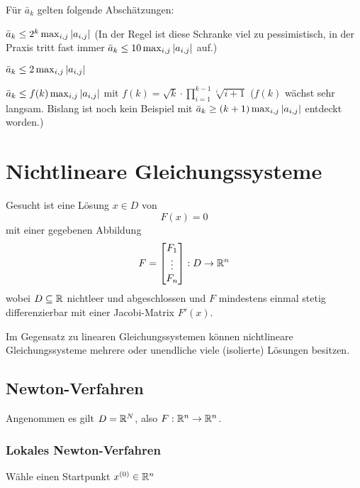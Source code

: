             Für \( \bar{a}_k \) gelten folgende Abschätzungen:
            \begin{description}[leftmargin = 5cm]
            	\item[Spaltenpivotsuche] \( \bar{a}_k \leq 2^k \max_{i,j} \abs{a_{i,j}} \) (In der Regel ist diese Schranke viel zu pessimistisch, in der Praxis tritt fast immer \( \bar{a}_k \leq 10 \max_{i,j} \abs{a_{i,j}} \) auf.)
            	\item[Spaltenpivotsuche (bei Tridiagonalmatrizen)] \( \bar{a}_k \leq 2 \max_{i,j} \abs{a_{i,j}} \)
            	\item[Vollständige Pivotsuche] \( \bar{a}_k \leq f(k) \max_{i,j} \abs{a_{i,j}} \) mit \( f(k) = \sqrt{k} \cdot \prod_{i = 1}^{k - 1} \sqrt[i]{i + 1} \) (\(f(k)\) wächst sehr langsam. Bislang ist noch kein Beispiel mit \( \bar{a}_k \geq (k + 1) \max_{i,j} \abs{a_{i,j}} \) entdeckt worden.)
            \end{description}

\chapter{Nichtlineare Gleichungssysteme}
    Gesucht ist eine Lösung \( x \in D \) von \[ F(x) = 0 \] mit einer gegebenen Abbildung
    \begin{equation*}
	    F =
	    \begin{bmatrix}
		    F_1 \\
		    \vdots \\
		    F_n
	    \end{bmatrix}
	    : D \rightarrow \mathbb{R}^n
    \end{equation*}
    wobei \( D \subseteq \mathbb{R} \) nichtleer und abgeschlossen und \(F\) mindestens einmal stetig differenzierbar mit einer Jacobi-Matrix \(F'(x)\).
    
    Im Gegensatz zu linearen Gleichungssystemen können nichtlineare Gleichungssysteme mehrere oder unendliche viele (isolierte) Lösungen besitzen.

    \section{Newton-Verfahren}
        Angenommen es gilt \( D = \mathbb{R}^N \), also \( F : \mathbb{R}^n \rightarrow \mathbb{R}^n \).

		\subsection{Lokales Newton-Verfahren}
			\begin{algorithm}[H]
				Wähle einen Startpunkt \( x^{(0)} \in \mathbb{R}^n \) \\
			\end{algorithm}
		

